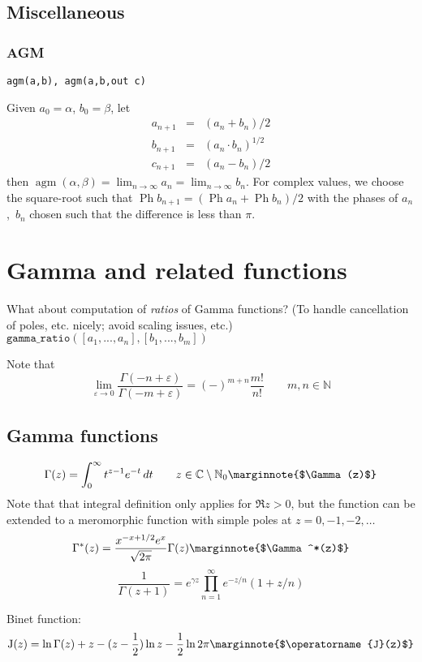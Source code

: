 \documentclass[10pt,dvipdfmx,letterpaper,twoside]{article}
\newcommand{\F}[1]{{\mathtt{#1}}}
\let\O=\operatorname
\newcommand{\CC}{{\mathbb{C}}}
\newcommand{\NN}{{\mathbb{N}}}
\newcommand{\NNo}{{\mathbb{N}_0}}
\let\DEF=\marginnote
\let\al=\alpha
\let\Gam=\Gamma
\let\eps=\varepsilon
\begin{document}
\subsection{Miscellaneous}

\subsubsection{AGM}

{\tt agm(a,b), agm(a,b,out c)}

Given $a_0=\al$, $b_0=\beta$, let 
\begin{eqnarray*}
  a_{n+1} &=& (a_n + b_n)/2 \\
  b_{n+1} &=& (a_n \cdot b_n)^{1/2} \\
  c_{n+1} &=& (a_n - b_n)/2
\end{eqnarray*}
then $\O{agm}(\al,\beta) = \lim_{n\to\infty}a_n = \lim_{n\to\infty}b_n$.
For complex values, we choose the square-root such that $\O{Ph}b_{n+1} = (\O{Ph}a_n + \O{Ph}b_n)/2$ with
the phases of $a_n$,~$b_n$ chosen such that the difference is less than $\pi$.

\section{Gamma and related functions}

What about computation of {\em ratios} of Gamma functions?
(To handle cancellation of poles, etc. nicely; avoid scaling issues, etc.)
$\F{gamma\_ratio}([a_1,...,a_n], [b_1,...,b_m])$

Note that
\[ \lim_{\eps\to0}\frac{\Gam(-n+\eps)}{\Gam(-m+\eps)} = (-)^{m+n}\frac{m!}{n!} \qquad m,n\in\NN \]


\subsection{Gamma functions}
\[ \Gam(z) = \int_0^\infty t^{z-1}e^{-t}\,dt \qquad z\in\CC\setminus\NNo  \DEF{$\Gam(z)$}\]
Note that that integral definition only applies for $\Re z>0$, but the function can be extended
to a meromorphic function with simple poles at $z=0,-1,-2,\dots$
\[ \Gam^*(z) = \frac{x^{-x+1/2} e^{x}}{\sqrt{2\pi}} \Gam(z)   \DEF{$\Gam^*(z)$}\]
\[ \frac{1}{\Gam(z+1)} = e^{\gamma z}\prod_{n=1}^\infty e^{-z/n}(1 + z/n) \]

Binet function:
\[ \O{J}(z) = \ln\Gam(z) + z - (z-\frac12)\ln z - \frac12\ln2\pi    \DEF{$\O{J}(z)$}\]
\end{document}
